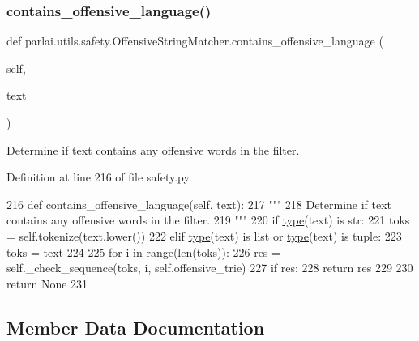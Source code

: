 \subsubsection{\texorpdfstring{contains\+\_\+offensive\+\_\+language()}{contains\_offensive\_language()}}
{\footnotesize\ttfamily def parlai.\+utils.\+safety.\+Offensive\+String\+Matcher.\+contains\+\_\+offensive\+\_\+language (\begin{DoxyParamCaption}\item[{}]{self,  }\item[{}]{text }\end{DoxyParamCaption})}

\begin{DoxyVerb}Determine if text contains any offensive words in the filter.
\end{DoxyVerb}
 

Definition at line 216 of file safety.\+py.


\begin{DoxyCode}
216     \textcolor{keyword}{def }contains\_offensive\_language(self, text):
217         \textcolor{stringliteral}{"""}
218 \textcolor{stringliteral}{        Determine if text contains any offensive words in the filter.}
219 \textcolor{stringliteral}{        """}
220         \textcolor{keywordflow}{if} \hyperlink{namespaceparlai_1_1agents_1_1tfidf__retriever_1_1build__tfidf_ad5dfae268e23f506da084a9efb72f619}{type}(text) \textcolor{keywordflow}{is} str:
221             toks = self.tokenize(text.lower())
222         \textcolor{keywordflow}{elif} \hyperlink{namespaceparlai_1_1agents_1_1tfidf__retriever_1_1build__tfidf_ad5dfae268e23f506da084a9efb72f619}{type}(text) \textcolor{keywordflow}{is} list \textcolor{keywordflow}{or} \hyperlink{namespaceparlai_1_1agents_1_1tfidf__retriever_1_1build__tfidf_ad5dfae268e23f506da084a9efb72f619}{type}(text) \textcolor{keywordflow}{is} tuple:
223             toks = text
224 
225         \textcolor{keywordflow}{for} i \textcolor{keywordflow}{in} range(len(toks)):
226             res = self.\_check\_sequence(toks, i, self.offensive\_trie)
227             \textcolor{keywordflow}{if} res:
228                 \textcolor{keywordflow}{return} res
229 
230         \textcolor{keywordflow}{return} \textcolor{keywordtype}{None}
231 
\end{DoxyCode}


\subsection{Member Data Documentation}
\mbox{\label{classparlai_1_1utils_1_1safety_1_1OffensiveStringMatcher_a47317e09499753db2a16fc36fd39de90}} 
